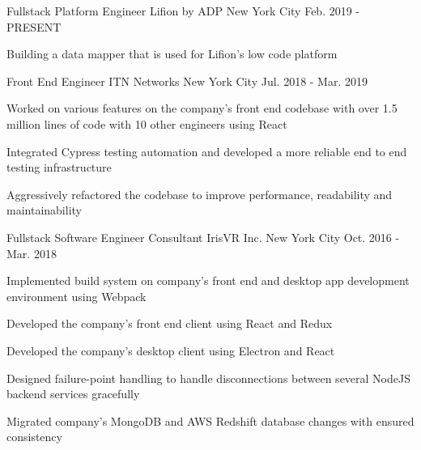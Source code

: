 

\begin{cventries}

  \cventry
    {Fullstack Platform Engineer} %
    {Lifion by ADP} %
    {New York City} %
    {Feb. 2019 - PRESENT} %
    {
      \begin{cvitems} %
        \item {Building a data mapper that is used for Lifion's low code platform}
      \end{cvitems}
    }

  \cventry
    {Front End Engineer} %
    {ITN Networks} %
    {New York City} %
    {Jul. 2018 - Mar. 2019} %
    {
      \begin{cvitems} %
        \item {Worked on various features on the company's front end codebase with over 1.5 million lines of code with 10 other engineers using React}
        \item {Integrated Cypress testing automation and developed a more reliable end to end testing infrastructure} 
        \item {Aggressively refactored the codebase to improve performance, readability and maintainability} 
      \end{cvitems}
    }

  \cventry
    {Fullstack Software Engineer Consultant} %
    {IrisVR Inc.} %
    {New York City} %
    {Oct. 2016 - Mar. 2018} %
    {
      \begin{cvitems} %
        \item {Implemented build system on company's front end and desktop app development environment using Webpack}
        \item {Developed the company's front end client using React and Redux}
        \item {Developed the company's desktop client using Electron and React}
        \item {Designed failure-point handling to handle disconnections between several NodeJS backend services gracefully}
        \item {Migrated company's MongoDB and AWS Redshift database changes with ensured consistency}
      \end{cvitems}
    }


\end{cventries}
